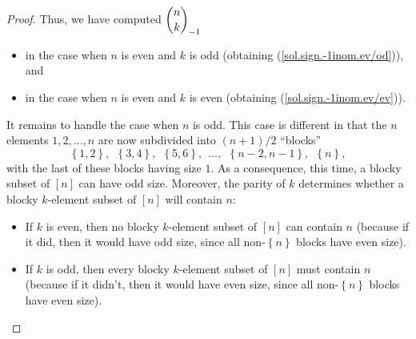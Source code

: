 \begin{proof}
Thus, we have computed $\dbinom{n}{k}_{-1}$

\begin{itemize}
\item in the case when $n$ is even and $k$ is odd (obtaining
(\ref{sol.sign.-1inom.ev/od})), and

\item in the case when $n$ is even and $k$ is even (obtaining
(\ref{sol.sign.-1inom.ev/ev})).
\end{itemize}

It remains to handle the case when $n$ is odd. This case is different in that
the $n$ elements $1,2,\ldots,n$ are now subdivided into $\left(  n+1\right)
/2$ \textquotedblleft blocks\textquotedblright%
\[
\left\{  1,2\right\}  ,\ \ \left\{  3,4\right\}  ,\ \ \left\{  5,6\right\}
,\ \ \ldots,\ \ \left\{  n-2,n-1\right\}  ,\ \ \left\{  n\right\}  ,
\]
with the last of these blocks having size $1$. As a consequence, this time, a
blocky subset of $\left[  n\right]  $ can have odd size. Moreover, the parity
of $k$ determines whether a blocky $k$-element subset of $\left[  n\right]  $
will contain $n$:

\begin{itemize}
\item If $k$ is even, then no blocky $k$-element subset of $\left[  n\right]
$ can contain $n$ (because if it did, then it would have odd size, since all
non-$\left\{  n\right\}  $ blocks have even size).

\item If $k$ is odd, then every blocky $k$-element subset of $\left[
n\right]  $ must contain $n$ (because if it didn't, then it would have even
size, since all non-$\left\{  n\right\}  $ blocks have even size).
\end{itemize}


\end{proof}
